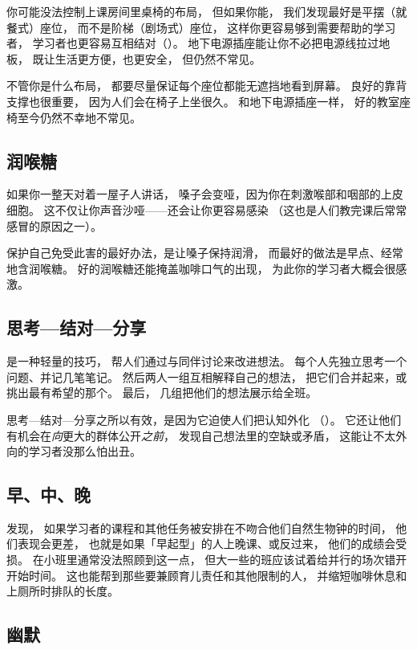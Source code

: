 你可能没法控制上课房间里桌椅的布局，
但如果你能，
我们发现最好是平摆（就餐式）座位，
而不是阶梯（剧场式）座位，
这样你更容易够到需要帮助的学习者，
学习者也更容易互相结对（）。
地下电源插座能让你不必把电源线拉过地板，
既让生活更方便，也更安全，
但仍然不常见。

不管你是什么布局，
都要尽量保证每个座位都能无遮挡地看到屏幕。
良好的靠背支撑也很重要，
因为人们会在椅子上坐很久。
和地下电源插座一样，
好的教室座椅至今仍然不幸地不常见。

\subsection*{润喉糖}

如果你一整天对着一屋子人讲话，
嗓子会变哑，因为你在刺激喉部和咽部的上皮细胞。
这不仅让你声音沙哑——还会让你更容易感染
（这也是人们教完课后常常感冒的原因之一）。

保护自己免受此害的最好办法，是让嗓子保持润滑，
而最好的做法是早点、经常地含润喉糖。
好的润喉糖还能掩盖咖啡口气的出现，
为此你的学习者大概会很感激。

\subsection*{思考—结对—分享}

是一种轻量的技巧，
帮人们通过与同伴讨论来改进想法。
每个人先独立思考一个问题、并记几笔笔记。
然后两人一组互相解释自己的想法，
把它们合并起来，或挑出最有希望的那个。
最后，
几组把他们的想法展示给全班。

思考—结对—分享之所以有效，是因为它迫使人们把认知外化
（）。
它还让他们有机会在\emph{向}更大的群体公开\emph{之前}，
发现自己想法里的空缺或矛盾，
这能让不太外向的学习者没那么怕出丑。

\subsection*{早、中、晚}

\cite{Smar2018}发现，
如果学习者的课程和其他任务被安排在不吻合他们自然生物钟的时间，
他们表现会更差，
也就是如果「早起型」的人上晚课、或反过来，
他们的成绩会受损。
在小班里通常没法照顾到这一点，
但大一些的班应该试着给并行的场次错开开始时间。
这也能帮到那些要兼顾育儿责任和其他限制的人，
并缩短咖啡休息和上厕所时排队的长度。

\subsection*{幽默}

